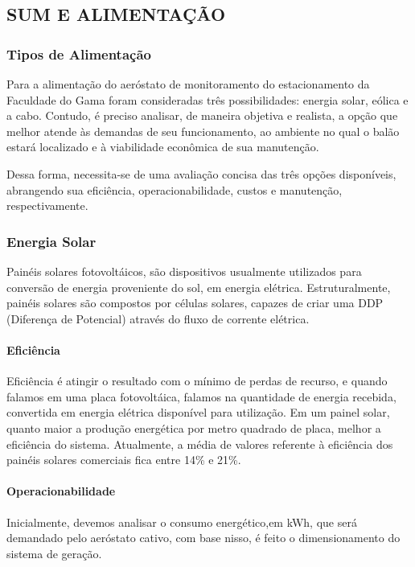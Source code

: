 \subsection{SUM E ALIMENTAÇÃO}

  \subsubsection{Tipos de Alimentação}
Para a alimentação do aeróstato de monitoramento do estacionamento da Faculdade do Gama foram consideradas três possibilidades: energia solar, eólica e a cabo.  Contudo, é preciso analisar, de maneira objetiva e realista, a opção que melhor  atende às demandas de seu funcionamento, ao ambiente no qual o balão estará localizado e à viabilidade econômica de sua manutenção.

Dessa forma, necessita-se de uma avaliação concisa das três opções disponíveis, abrangendo sua eficiência, operacionabilidade, custos e manutenção, respectivamente.
  
  \subsubsection{Energia Solar}
  Painéis solares fotovoltáicos, são dispositivos usualmente utilizados para conversão de energia proveniente do sol, em energia elétrica. Estruturalmente, painéis solares são compostos por células solares, capazes de criar uma DDP (Diferença de Potencial) através do fluxo de corrente elétrica.
    
    \paragraph{Eficiência}
  Eficiência é atingir o resultado com o mínimo de perdas de recurso, e quando falamos em uma placa fotovoltáica, falamos na quantidade de energia recebida, convertida em energia elétrica disponível para utilização. Em um painel solar, quanto maior a produção energética por metro quadrado de placa, melhor a eficiência do sistema. Atualmente, a média de valores referente à eficiência dos painéis solares comerciais fica entre 14\% e 21\%.
    
    \paragraph{Operacionabilidade}
  Inicialmente, devemos analisar o consumo energético,em kWh, que será demandado pelo aeróstato cativo, com base nisso, é feito o dimensionamento do sistema de geração.
    
